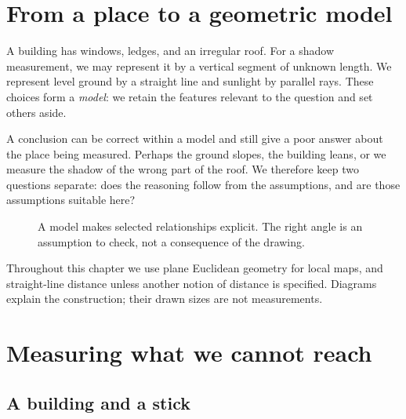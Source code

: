 \section{From a place to a geometric model}
\label{sec:geo-model}
A building has windows, ledges, and an irregular roof. For a shadow
measurement, we may represent it by a vertical segment of unknown length.
We represent level ground by a straight line and sunlight by parallel
rays. These choices form a \emph{model}: we retain the features relevant
to the question and set others aside.

A conclusion can be correct within a model and still give a poor answer
about the place being measured. Perhaps the ground slopes, the building
leans, or we measure the shadow of the wrong part of the roof. We therefore
keep two questions separate: does the reasoning follow from the assumptions,
and are those assumptions suitable here?

\begin{figure}[htbp]\centering
{}
\caption{A model makes selected relationships explicit. The right angle is an assumption to check, not a consequence of the drawing.}
\end{figure}

Throughout this chapter we use plane Euclidean geometry for local maps,
and straight-line distance unless another notion of distance is specified.
Diagrams explain the construction; their drawn sizes are not measurements.

\section{Measuring what we cannot reach}
\label{sec:geo-measure}
\subsection{A building and a stick}
